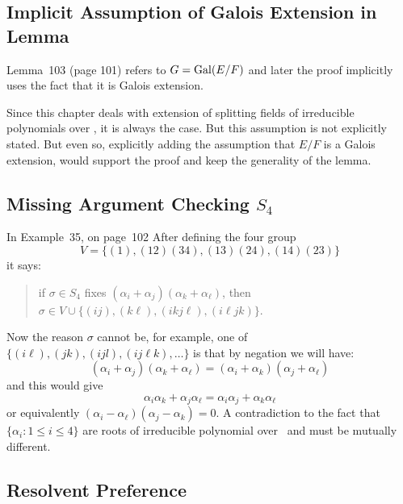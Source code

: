 \subsection{Implicit Assumption of Galois Extension in Lemma}

Lemma~103 (page 101) refers to \(G = \mathop{\rm Gal}\nolimits(E/F)\) and
later the proof implicitly uses the fact that it is Galois
extension.

Since this chapter deals with extension of splitting fields
of irreducible polynomials over \Q, it is always the case.
But this assumption is not explicitly stated.
But even so, explicitly adding the assumption that \(E/F\)
is a Galois extension, would support the proof
and keep the generality of the lemma.


\subsection{Missing Argument Checking \ensuremath{S_4}}

In Example~35, on page~102 After defining the four group
\begin{equation*}
 V = \{(1),(12)(34), (13)(24), (14)(23)\}
\end{equation*}
it says:
\begin{quotation}
\mldots if \(\sigma \in S_4\) fixes
 \((\alpha_i + \alpha_j)(\alpha_k+\alpha_\ell)\),
then \(\sigma \in V \cup \{(ij), (k\ell), (i k j \ell), (i\ell jk)\}\).
\end{quotation}

Now the reason \(\sigma\) cannot be, for example, one of
\(\{(i\ell),(jk),(ijl),(ij\ell k),\ldots\}\)
is that by negation we will have:
\begin{equation*}
 (\alpha_i + \alpha_j)(\alpha_k+\alpha_\ell) =
 (\alpha_i + \alpha_k)(\alpha_j+\alpha_\ell)
\end{equation*}
and this would give
\begin{equation*}
 \alpha_i\alpha_k + \alpha_j\alpha_\ell =
 \alpha_i\alpha_j + \alpha_k\alpha_\ell
\end{equation*}
or equivalently \((\alpha_i-\alpha_\ell)(\alpha_j - \alpha_k) = 0\).
A contradiction to the fact that \(\{\alpha_i: 1\leq i \leq 4\}\) are
roots of irreducible polynomial over \Q\ and must be mutually different.


\subsection{Resolvent Preference} \label{ss:resolv:foot}

